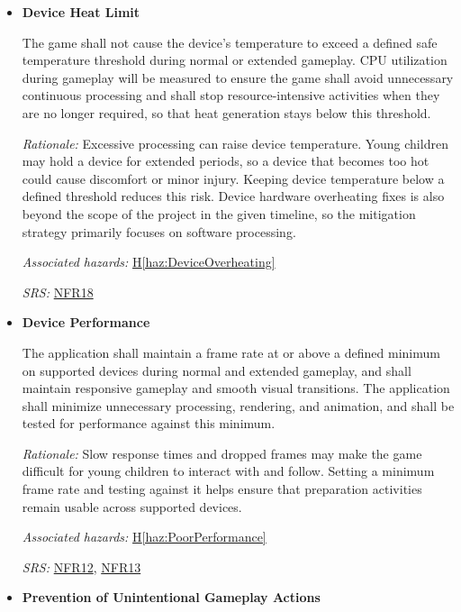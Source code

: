 \documentclass{article}
\newcounter{hazard}
\newcommand{\hazref}[1]{\hyperref[haz:#1]{H\ref*{haz:#1}}}
\newcounter{sr}
\newcommand{\srdef}[1]{\refstepcounter{sr}\label{sr:#1}\textbf{SR-\thesr:}}
\newcommand{\srsurl}{https://team-hindsight.github.io/ophthamology-game/SRS/SRS.pdf}
\newcommand{\srsnfrref}[2]{\href{\srsurl\#nameddest=#1}{NFR#2}}
\begin{document}
\begin{itemize}[leftmargin=1.5cm, labelwidth=1.3cm, labelsep=0.2cm,
  align=left, itemsep=1.2em, parsep=0.6em]

\item[\srdef{DeviceResourceUse}]
\textbf{Device Heat Limit}

The game shall not cause the device's temperature to exceed
a defined safe temperature threshold during normal or extended
gameplay. CPU utilization during gameplay will be measured to ensure 
the game shall avoid unnecessary continuous processing and shall 
stop resource-intensive activities when they are no longer required, 
so that heat generation stays below this threshold.

\textit{Rationale:}
Excessive processing can raise device temperature. Young
children may hold a device for extended periods, so a device
that becomes too hot could cause discomfort or minor injury.
Keeping device temperature below a defined threshold reduces
this risk. Device hardware overheating fixes is also beyond 
the scope of the project in the given timeline, so the mitigation 
strategy primarily focuses on software processing.

\textit{Associated hazards:}
\hazref{DeviceOverheating}

\textit{SRS:} \srsnfrref{NFR_DeviceHeat}{18}

\item[\srdef{DevicePerformance}]
\textbf{Device Performance}

The application shall maintain a frame rate at or above a
defined minimum on supported devices during normal and
extended gameplay, and shall maintain responsive gameplay
and smooth visual transitions. The application shall minimize
unnecessary processing, rendering, and animation, and shall be
tested for performance against this minimum.

\textit{Rationale:}
Slow response times and dropped frames may make the game
difficult for young children to interact with and follow.
Setting a minimum frame rate and testing against it helps
ensure that preparation activities remain usable across
supported devices.

\textit{Associated hazards:}
\hazref{PoorPerformance}

\textit{SRS:} \srsnfrref{NFR_Responsiveness}{12}, \srsnfrref{NFR_Smoothness}{13}

\item[\srdef{PreventAccidentalInput}]
\textbf{Prevention of Unintentional Gameplay Actions}


\end{itemize}
\end{document}
